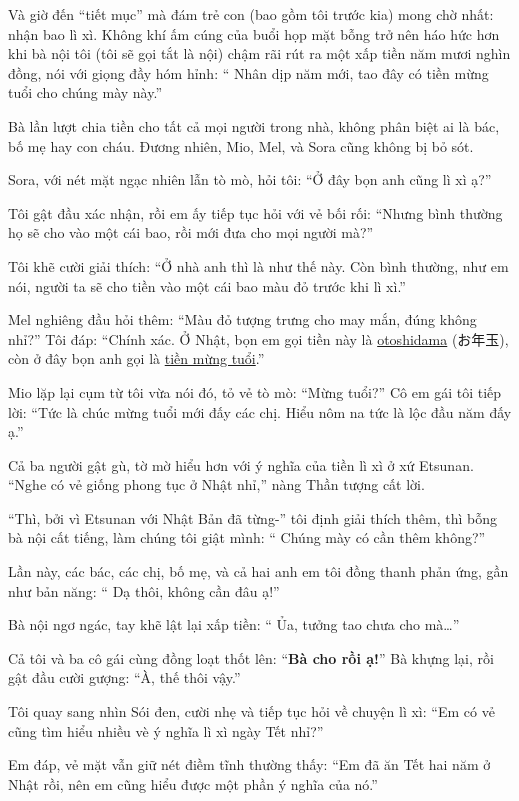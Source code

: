 \documentclass[../main.tex]{subfiles}
\begin{document}
Và giờ đến ``tiết mục'' mà đám trẻ con (bao gồm tôi trước kia) mong chờ nhất: nhận bao lì xì. Không khí ấm cúng của buổi họp mặt bỗng trở nên háo hức hơn khi bà nội tôi (tôi sẽ gọi tắt là nội) chậm rãi rút ra một xấp tiền năm mươi nghìn đồng, nói với giọng đầy hóm hỉnh: ``{\color{red} Nhân dịp năm mới, tao đây có tiền mừng tuổi cho chúng mày này.}''

Bà lần lượt chia tiền cho tất cả mọi người trong nhà, không phân biệt ai là bác, bố mẹ hay con cháu. Đương nhiên, Mio, Mel, và Sora cũng không bị bỏ sót.

Sora, với nét mặt ngạc nhiên lẫn tò mò, hỏi tôi: ``Ở đây bọn anh cũng lì xì ạ?''

Tôi gật đầu xác nhận, rồi em ấy tiếp tục hỏi với vẻ bối rối: ``Nhưng bình thường họ sẽ cho vào một cái bao, rồi mới đưa cho mọi người mà?''

Tôi khẽ cười giải thích: ``Ở nhà anh thì là như thế này. Còn bình thường, như em nói, người ta sẽ cho tiền vào một cái bao màu đỏ trước khi lì xì.''

Mel nghiêng đầu hỏi thêm: ``Màu đỏ tượng trưng cho may mắn, đúng không nhỉ?'' Tôi đáp: ``Chính xác. Ở Nhật, bọn em gọi tiền này là \uline{otoshidama} (お年玉), còn ở đây bọn anh gọi là \uline{tiền mừng tuổi}.''

Mio lặp lại cụm từ tôi vừa nói đó, tỏ vẻ tò mò: ``Mừng tuổi?'' Cô em gái tôi tiếp lời: ``Tức là chúc mừng tuổi mới đấy các chị. Hiểu nôm na tức là lộc đầu năm đấy ạ.''

Cả ba người gật gù, tờ mờ hiểu hơn với ý nghĩa của tiền lì xì ở xứ Etsunan. ``Nghe có vẻ giống phong tục ở Nhật nhỉ,'' nàng Thần tượng cất lời.

``Thì, bởi vì Etsunan với Nhật Bản đã từng-'' tôi định giải thích thêm, thì bỗng bà nội cất tiếng, làm chúng tôi giật mình: ``{\color{red} Chúng mày có cần thêm không?}''

Lần này, các bác, các chị, bố mẹ, và cả hai anh em tôi đồng thanh phản ứng, gần như bản năng: ``{\color{red} Dạ thôi, không cần đâu ạ!}''

Bà nội ngơ ngác, tay khẽ lật lại xấp tiền: ``{\color{red} Ủa, tưởng tao chưa cho mà\dots}''

Cả tôi và ba cô gái cùng đồng loạt thốt lên: ``\textbf{Bà cho rồi ạ!}'' Bà khựng lại, rồi gật đầu cười gượng: ``À, thế thôi vậy.''

Tôi quay sang nhìn Sói đen, cười nhẹ và tiếp tục hỏi về chuyện lì xì: ``Em có vẻ cũng tìm hiểu nhiều vè ý nghĩa lì xì ngày Tết nhỉ?''

Em đáp, vẻ mặt vẫn giữ nét điềm tĩnh thường thấy: ``Em đã ăn Tết hai năm ở Nhật rồi, nên em cũng hiểu được một phần ý nghĩa của nó.''
\end{document}
